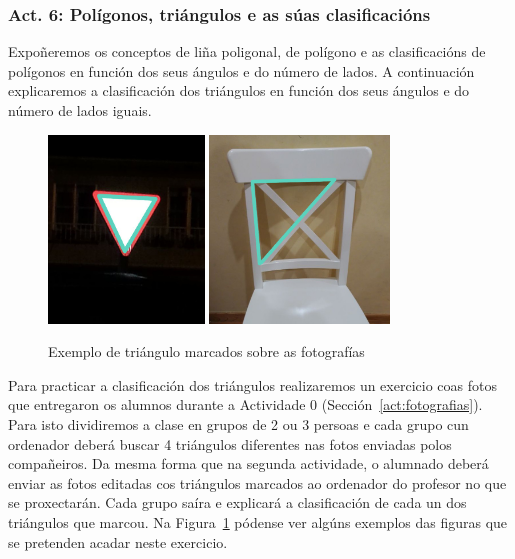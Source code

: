 \subsubsection{Act. 6: Polígonos, triángulos e as súas clasificacións}\label{act:clastriangulos}
Expoñeremos os conceptos de liña poligonal, de polígono e as clasificacións de polígonos en función dos seus ángulos e do número de lados. A continuación explicaremos a clasificación dos triángulos en función dos seus ángulos e do número de lados iguais.

\begin{figure}[h!]
  \centering
  \includegraphics[height=5cm]{img/trian1.jpg}
  \includegraphics[height=5cm]{img/trian2.jpg}
  \caption{Exemplo de triángulo marcados sobre as fotografías}\label{fig:act7}
\end{figure}

Para practicar a clasificación dos triángulos realizaremos un exercicio coas fotos que entregaron os alumnos durante a Actividade 0 (Sección~\ref{act:fotografias}). Para isto dividiremos a clase en grupos de 2 ou 3 persoas e cada grupo cun ordenador deberá buscar 4 triángulos diferentes nas fotos enviadas polos compañeiros. Da mesma forma que na segunda actividade, o alumnado deberá enviar as fotos editadas cos triángulos marcados ao ordenador do profesor no que se proxectarán. Cada grupo saíra e explicará a clasificación de cada un dos triángulos que marcou. Na Figura~\ref{fig:act7} pódense ver algúns exemplos das figuras que se pretenden acadar neste exercicio.

